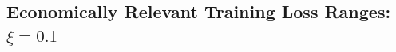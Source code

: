 \documentclass[12pt]{article}
\begin{document}
\begin{appendices}
\newpage
\clearpage

\subsection{Economically Relevant Training Loss Ranges: $\xi = 0.1$}






\end{appendices}
\end{document}
